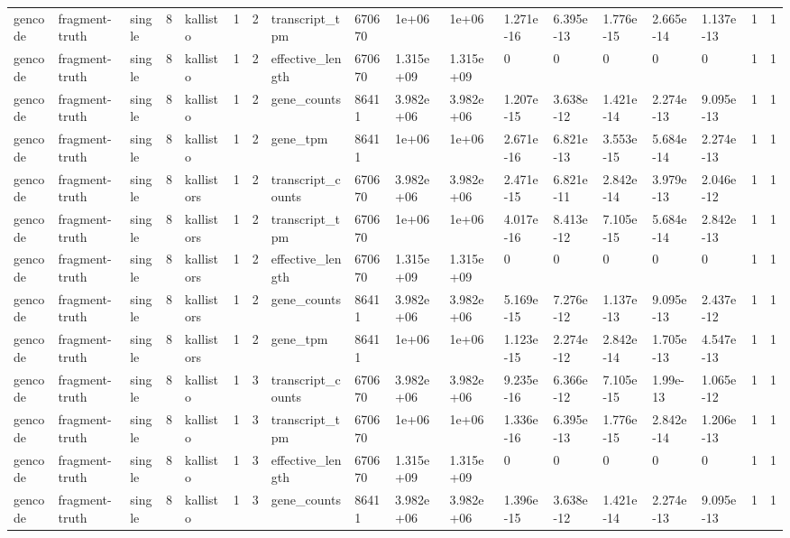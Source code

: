 \begin{tabular}{llllllllllllllllll}
gencode & fragment-truth & single & 8 & kallisto & 1 & 2 & transcript\_tpm & 670670 & 1e+06 & 1e+06 & 1.271e-16 & 6.395e-13 & 1.776e-15 & 2.665e-14 & 1.137e-13 & 1 & 1 \\
gencode & fragment-truth & single & 8 & kallisto & 1 & 2 & effective\_length & 670670 & 1.315e+09 & 1.315e+09 & 0 & 0 & 0 & 0 & 0 & 1 & 1 \\
gencode & fragment-truth & single & 8 & kallisto & 1 & 2 & gene\_counts & 86411 & 3.982e+06 & 3.982e+06 & 1.207e-15 & 3.638e-12 & 1.421e-14 & 2.274e-13 & 9.095e-13 & 1 & 1 \\
gencode & fragment-truth & single & 8 & kallisto & 1 & 2 & gene\_tpm & 86411 & 1e+06 & 1e+06 & 2.671e-16 & 6.821e-13 & 3.553e-15 & 5.684e-14 & 2.274e-13 & 1 & 1 \\
gencode & fragment-truth & single & 8 & kallistors & 1 & 2 & transcript\_counts & 670670 & 3.982e+06 & 3.982e+06 & 2.471e-15 & 6.821e-11 & 2.842e-14 & 3.979e-13 & 2.046e-12 & 1 & 1 \\
gencode & fragment-truth & single & 8 & kallistors & 1 & 2 & transcript\_tpm & 670670 & 1e+06 & 1e+06 & 4.017e-16 & 8.413e-12 & 7.105e-15 & 5.684e-14 & 2.842e-13 & 1 & 1 \\
gencode & fragment-truth & single & 8 & kallistors & 1 & 2 & effective\_length & 670670 & 1.315e+09 & 1.315e+09 & 0 & 0 & 0 & 0 & 0 & 1 & 1 \\
gencode & fragment-truth & single & 8 & kallistors & 1 & 2 & gene\_counts & 86411 & 3.982e+06 & 3.982e+06 & 5.169e-15 & 7.276e-12 & 1.137e-13 & 9.095e-13 & 2.437e-12 & 1 & 1 \\
gencode & fragment-truth & single & 8 & kallistors & 1 & 2 & gene\_tpm & 86411 & 1e+06 & 1e+06 & 1.123e-15 & 2.274e-12 & 2.842e-14 & 1.705e-13 & 4.547e-13 & 1 & 1 \\
gencode & fragment-truth & single & 8 & kallisto & 1 & 3 & transcript\_counts & 670670 & 3.982e+06 & 3.982e+06 & 9.235e-16 & 6.366e-12 & 7.105e-15 & 1.99e-13 & 1.065e-12 & 1 & 1 \\
gencode & fragment-truth & single & 8 & kallisto & 1 & 3 & transcript\_tpm & 670670 & 1e+06 & 1e+06 & 1.336e-16 & 6.395e-13 & 1.776e-15 & 2.842e-14 & 1.206e-13 & 1 & 1 \\
gencode & fragment-truth & single & 8 & kallisto & 1 & 3 & effective\_length & 670670 & 1.315e+09 & 1.315e+09 & 0 & 0 & 0 & 0 & 0 & 1 & 1 \\
gencode & fragment-truth & single & 8 & kallisto & 1 & 3 & gene\_counts & 86411 & 3.982e+06 & 3.982e+06 & 1.396e-15 & 3.638e-12 & 1.421e-14 & 2.274e-13 & 9.095e-13 & 1 & 1 \\

\end{tabular}
